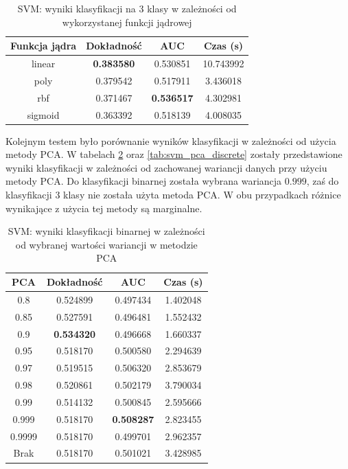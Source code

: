 \documentclass[a4paper, twoside, 11pt, openright]{article}
\begin{document}
\begin{table}[H]
    \centering
    \begin{tabular}{|c|c|c|c|}
    \hline
        \textbf{Funkcja jądra} & \textbf{Dokładność} & \textbf{AUC} & \textbf{Czas (s)} \\ \hline
linear  &  \textbf{0.383580} &  0.530851 &   10.743992 \\ \hline
poly    &  0.379542 &  0.517911 &    3.436018 \\ \hline
rbf     &  0.371467 &  \textbf{0.536517} &    4.302981 \\ \hline
sigmoid &  0.363392 &  0.518139 &    4.008035 \\ \hline
    \end{tabular}
    \caption{SVM: wyniki klasyfikacji na 3 klasy w zależności od wykorzystanej funkcji jądrowej}
    \label{tab:svm_kernel_discrete}
\end{table}


Kolejnym testem było porównanie wyników klasyfikacji w zależności od użycia metody PCA. W tabelach \ref{tab:svm_pca_binary} oraz \ref{tab:svm_pca_discrete} zostały przedstawione wyniki klasyfikacji w zależności od zachowanej wariancji danych przy użyciu metody PCA. Do klasyfikacji binarnej została wybrana wariancja $0.999$, zaś do klasyfikacji 3 klasy nie została użyta metoda PCA. W obu przypadkach różnice wynikające z użycia tej metody są marginalne.

\begin{table}[H]
    \centering
    \begin{tabular}{|c|c|c|c|}
    \hline
        \textbf{PCA} & \textbf{Dokładność} &  \textbf{AUC} &  \textbf{Czas (s)} \\ \hline
0.8                &  0.524899 &  0.497434 &    1.402048 \\ \hline
0.85               &  0.527591 &  0.496481 &    1.552432 \\ \hline
0.9                &  \textbf{0.534320} &  0.496668 &    1.660337 \\ \hline
0.95               &  0.518170 &  0.500580 &    2.294639 \\ \hline
0.97               &  0.519515 &  0.506320 &    2.853679 \\ \hline
0.98               &  0.520861 &  0.502179 &    3.790034 \\ \hline
0.99               &  0.514132 &  0.500845 &    2.595666 \\ \hline
0.999 				&  0.518170 &  \textbf{0.508287} &    2.823455 \\ \hline
0.9999             &  0.518170 &  0.499701 &    2.962357 \\ \hline
Brak                &  0.518170 &  0.501021 &    3.428985 \\ \hline
    \end{tabular}
    \caption{SVM: wyniki klasyfikacji binarnej w zależności od wybranej wartości wariancji w metodzie PCA}
    \label{tab:svm_pca_binary}
\end{table}
\end{document}
